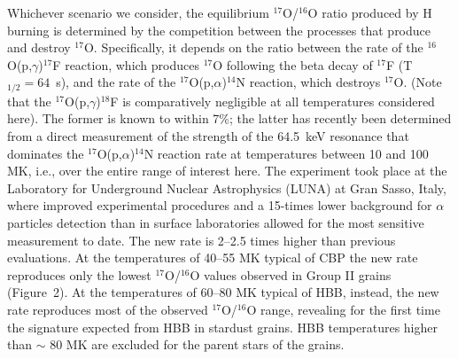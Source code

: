\documentclass{nature}
\newcommand{\iso}[2]{\hbox{${}^{#1}${#2}}}
\begin{document}
Whichever scenario we consider, the equilibrium \iso{17}O/\iso{16}O ratio produced by H 
burning is determined by the competition between the processes that produce and 
destroy \iso{17}O. Specifically, it depends on the ratio between the rate of the 
\iso{16}O(p,$\gamma$)\iso{17}F reaction, which produces \iso{17}O following the beta decay 
of \iso{17}F (T$_{1/2} = 64$~s), and the rate of the \iso{17}O(p,$\alpha$)\iso{14}N 
reaction, which destroys \iso{17}O. (Note that the \iso{17}O(p,$\gamma$)\iso{18}F is 
comparatively negligible at all temperatures considered here). The former is known to within 
7\%\cite{iliadis08,iliadis10}; the latter has recently been determined\cite{bruno16} from a 
direct measurement of the strength of the 64.5~keV resonance that dominates the 
\iso{17}O(p,$\alpha$)\iso{14}N reaction rate at temperatures between 10 and 100 
MK\cite{bruno16}, i.e., over the entire range of interest here. The experiment took place at 
the Laboratory for Underground Nuclear Astrophysics (LUNA) at Gran Sasso, Italy, where 
improved experimental procedures and a 15-times 
lower background for $\alpha$ particles detection than in surface laboratories allowed 
for the most sensitive measurement to date\cite{bruno16}. The new rate is 2--2.5 times 
higher than previous evaluations\cite{iliadis10,buckner15}.  At the temperatures of 40--55 
MK typical of CBP the new rate reproduces only the lowest \iso{17}O/\iso{16}O values 
observed in Group II grains (Figure~2). At the temperatures of 60--80 MK 
typical of HBB, instead, the new rate reproduces most of the observed \iso{17}O/\iso{16}O 
range, revealing for the first time the signature expected from HBB in stardust grains. 
HBB temperatures higher than $\sim$ 80 MK are excluded for the parent stars of the grains.
\end{document}
